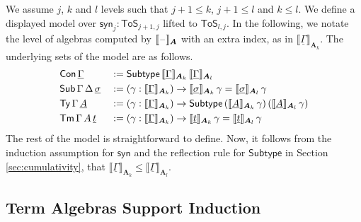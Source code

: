 \documentclass[sigplan,review,anonymous]{acmart}\settopmatter{printfolios=true,printccs=false,printacmref=false}
\newcommand{\ToS}{\mathsf{ToS}}
\newcommand{\Subtype}{\mathsf{Subtype}}
\newcommand{\syn}{\mathsf{syn}}
\newcommand{\bA}{\boldsymbol{A}}
\newcommand{\ul}[1]{\underline{#1}}
\newcommand{\ulGamma}{\ul{\Gamma}}
\newcommand{\ulsigma}{\ul{\sigma}}
\newcommand{\ult}{\ul{t}}
\newcommand{\ulA}{\ul{A}}
\newcommand{\llb}{\llbracket}
\newcommand{\rrb}{\rrbracket}
\begin{document}
\begin{definition} We assume $j$, $k$ and $l$ levels such that $j+1 \leq k$, $j+1 \leq l$ and $k \leq l$. We define a displayed model over $\syn_j : \ToS_{j+1, j}$ lifted to
$\ToS_{l, j}$. In the following, we notate the level of algebras computed by
  $\llb\blank\rrb_{\bA}$ with an extra index, as in
  $\llb\ulGamma\rrb_{\bA_k}$. The underlying sets of the model are as follows.
\begin{alignat*}{3}
  & \Con\,\ulGamma && := \Subtype\,\llb\ulGamma\rrb_{\bA_k}\,\llb\ulGamma\rrb_{\bA_l}\\
  & \Sub\,\Gamma\,\Delta\,\ulsigma && := (\gamma : \llb\ulGamma\rrb_{\bA_k})\ra
  \llb\ulsigma\rrb_{\bA_k}\,\gamma = \llb\ulsigma\rrb_{\bA_l}\,\gamma\\
  & \Ty\,\Gamma\,\ulA &&:= (\gamma : \llb\ulGamma\rrb_{\bA_k})\ra
      \Subtype\,(\llb\ulA\rrb_{\bA_k}\,\gamma)\,(\llb\ulA\rrb_{\bA_l}\,\gamma)\\
  & \Tm\,\Gamma\,A\,\ult &&:= (\gamma : \llb\ulGamma\rrb_{\bA_k})\ra
     \llb\ult\rrb_{\bA_k}\,\gamma = \llb\ult\rrb_{\bA_l}\,\gamma
\end{alignat*}
The rest of the model is straightforward to define. Now, it follows from the
induction assumption for $\syn$ and the reflection rule for $\Subtype$ in
Section \ref{sec:cumulativity}, that $\llb\ulGamma\rrb_{\bA_k} \leq
\llb\ulGamma\rrb_{\bA_l}$.
\end{definition}

\subsection{Term Algebras Support Induction}
\end{document}
